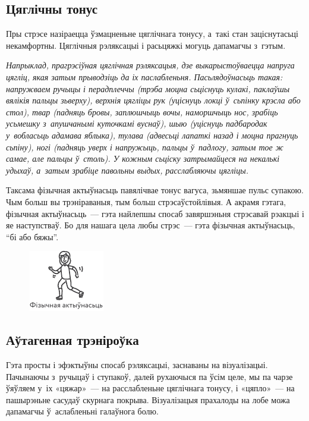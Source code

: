 \subsection*{Цяглічны тонус}

Пры стрэсе назіраецца ўзмацненьне цяглічнага тонусу, а~такі стан заціснутасьці некамфортны. Цяглічныя рэляксацыі і расьцяжкі могуць дапамагчы з~гэтым. 

\emph{Напрыклад, прагрэсіўная цяглічная рэляксацыя, дзе выкарыстоўваецца напруга цягліц, якая затым прыводзіць да іх паслабленьня. Пасьлядоўнасьць такая: напружваем ручыцы і перадплеччы (трэба моцна сьціснуць кулакі, паклаўшы вялікія пальцы зьверху), верхнія цягліцы рук (уціснуць локці ў~сьпінку крэсла або стол), твар (падняць бровы, заплюшчыць вочы, наморшчыць нос, зрабіць усьмешку з~апушчанымі куточкамі вуснаў), шыю (уціснуць падбародак у~вобласьць адамава яблыка), тулава (адвесьці лапаткі назад і моцна прагнуць сьпіну), ногі (падняць уверх і напружыць, пальцы ў~падлогу, затым тое ж самае, але пальцы ў~столь). У кожным сьціску затрымайцеся на некалькі удыхаў, а~затым зрабіце павольны выдых, расслабляючы цягліцы.}

Таксама фізычная актыўнасьць павялічвае тонус вагуса, зьмяншае пульс супакою. Чым больш вы трэніраваныя, тым больш стрэсаўстойлівыя. А акрамя гэтага, фізычная актыўнасьць~--- гэта найлепшы спосаб завяршэньня стрэсавай рэакцыі і яе наступстваў. Бо для нашага цела любы стрэс~--- гэта фізычная актыўнасьць, ``бі або бяжы''.

\begin{figure}[htb!]
  \centering
  \includegraphics[scale=1.5]{willpower/ch7/21.pdf}
\end{figure}

\subsection*{Аўтагенная трэніроўка}

Гэта просты і эфэктыўны спосаб рэляксацыі, заснаваны на візуалізацыі. Пачынаючы з~ручыцаў і ступакоў, далей рухаючыся па ўсім целе, мы па чарзе ўяўляем у~іх «цяжар»~--- на расслабленьне цяглічнага тонусу, і «цяпло»~--- на пашырэньне сасудаў скурнага покрыва. Візуалізацыя прахалоды на лобе можа дапамагчы ў~аслабленьні галаўнога болю.

